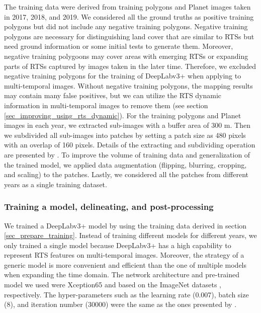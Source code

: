 \documentclass[authoryear,preprint,review,12pt]{elsarticle}
\begin{document}
The training data were derived from training polygons and Planet images taken in 2017, 2018, and 2019. 
We considered all the ground truths as positive training polygons but did not include any negative training polygons. 
Negative training polygons are necessary for distinguishing land cover that are similar to RTSs but need ground information or some initial tests to generate them. 
Moreover, negative training polygoons may cover areas with emerging RTSs or expanding parts of RTSs captured by images taken in the later time.
Therefore, we excluded negative training polygons for the training of DeepLabv3+ when applying to multi-temporal images.
Without negative training polygons, the mapping results may contain many false positives, but we can utilize the RTS dynamic information in multi-temporal images to remove them (see section \ref{sec_improving_using_rts_dynamic}).
For the training polygons and Planet images in each year, we extracted sub-images with a buffer area of 300 m. 
Then we subdivided all sub-images into patches by setting a patch size as 480 pixels with an overlap of 160 pixels. 
Details of the extracting and subdividing operation are presented by \cite{huang2018automatic}.
To improve the volume of training data and generalization of the trained model, we applied data augmentation (flipping, blurring, cropping, and scaling) to the patches. 
Lastly, we considered all the patches from different years as a single training dataset. 



\subsubsection{Training a model, delineating, and post-processing}
\label{sec_train_deli_post_pro}

We trained a DeepLabv3+ model by using the training data derived in section \ref{sec_prepare_training}. 
Instead of training different models for different years, we only trained a single model because DeepLabv3+ has a high capability to represent RTS features on multi-temporal images. 
Moreover, the strategy of a generic model is more convenient and efficient than the one of multiple models when expanding the time domain. %
The network architecture and pre-trained model we used were Xception65 \citep{chollet2017xception} and based on the ImageNet datasets \citep{russakovsky2015imagenet}, respectively. 
The hyper-parameters such as the learning rate (0.007), batch size (8), and iteration number (30000) were the same as the ones presented by \cite{huang2020using}.
\end{document}
